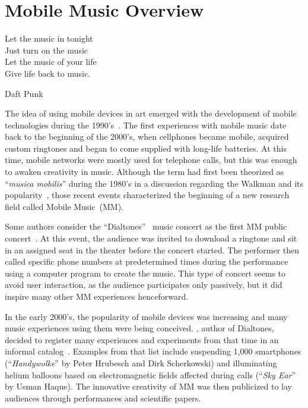 \chapter{Mobile Music Overview}
\label{cap:mobilemusic}

 \epigraph{
	Let the music in tonight\\
	Just turn on the music\\
	Let the music of your life\\
	Give life back to music.}
 {Daft Punk}

The idea of using mobile devices in art emerged with the development of mobile technologies during the 1990's~\citep{deSouzaeSilva2004}.
The first experiences with mobile music date back to the beginning of the 2000's, when cellphones became mobile, acquired custom ringtones and began to come supplied with long-life batteries.
At this time, mobile networks were mostly used for telephone calls, but this was enough to awaken creativity in music.
Although the term had first been theorized as ``\textit{musica mobilis}'' during the 1980's in a discussion regarding the Walkman and its popularity~\citep[p.~5--6]{Gopinath2014handbookmobilemusicstudies1}, those recent events characterized the beginning of a new research field called Mobile Music~(MM).

Some authors consider the ``Dialtones''~\citep{Levin2001} music concert as the first MM public concert~\citep{Wang2014ocarina,Weinberg2005interconnected}.
At this event, the audience was invited to download a ringtone and sit in an assigned seat in the theater before the concert started.
The performer then called specific phone numbers at predetermined times during the performance using a computer program to create the music.
This type of concert seems to avoid user interaction, as the audience participates only passively, but it did inspire many other MM experiences henceforward.

In the early 2000's, the popularity of mobile devices was increasing and many music experiences using them were being conceived.
, author of Dialtones, decided to register many experiences and experiments from that time in an informal catalog~\citep{Levin2004}.
Examples from that list include suspending 1,000 smartphones (``\textit{Handywolke}'' by Peter Hrubesch and Dirk Scherkowski) and illuminating helium balloons based on electromagnetic fields affected during calls (``\textit{Sky Ear}'' by Usman Haque).
The innovative creativity of MM was then publicized to lay audiences through performances and scientific papers.

